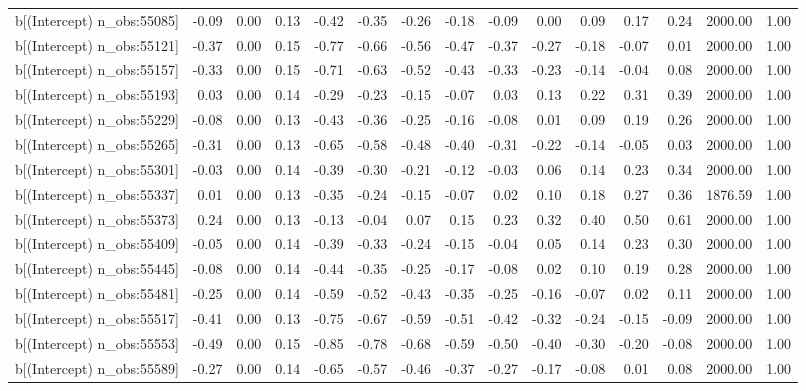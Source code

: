 \begin{table}[ht]
\begin{tabular}{rrrrrrrrrrrrrrr}
  b[(Intercept) n\_obs:55085] & -0.09 & 0.00 & 0.13 & -0.42 & -0.35 & -0.26 & -0.18 & -0.09 & 0.00 & 0.09 & 0.17 & 0.24 & 2000.00 & 1.00 \\ 
  b[(Intercept) n\_obs:55121] & -0.37 & 0.00 & 0.15 & -0.77 & -0.66 & -0.56 & -0.47 & -0.37 & -0.27 & -0.18 & -0.07 & 0.01 & 2000.00 & 1.00 \\ 
  b[(Intercept) n\_obs:55157] & -0.33 & 0.00 & 0.15 & -0.71 & -0.63 & -0.52 & -0.43 & -0.33 & -0.23 & -0.14 & -0.04 & 0.08 & 2000.00 & 1.00 \\ 
  b[(Intercept) n\_obs:55193] & 0.03 & 0.00 & 0.14 & -0.29 & -0.23 & -0.15 & -0.07 & 0.03 & 0.13 & 0.22 & 0.31 & 0.39 & 2000.00 & 1.00 \\ 
  b[(Intercept) n\_obs:55229] & -0.08 & 0.00 & 0.13 & -0.43 & -0.36 & -0.25 & -0.16 & -0.08 & 0.01 & 0.09 & 0.19 & 0.26 & 2000.00 & 1.00 \\ 
  b[(Intercept) n\_obs:55265] & -0.31 & 0.00 & 0.13 & -0.65 & -0.58 & -0.48 & -0.40 & -0.31 & -0.22 & -0.14 & -0.05 & 0.03 & 2000.00 & 1.00 \\ 
  b[(Intercept) n\_obs:55301] & -0.03 & 0.00 & 0.14 & -0.39 & -0.30 & -0.21 & -0.12 & -0.03 & 0.06 & 0.14 & 0.23 & 0.34 & 2000.00 & 1.00 \\ 
  b[(Intercept) n\_obs:55337] & 0.01 & 0.00 & 0.13 & -0.35 & -0.24 & -0.15 & -0.07 & 0.02 & 0.10 & 0.18 & 0.27 & 0.36 & 1876.59 & 1.00 \\ 
  b[(Intercept) n\_obs:55373] & 0.24 & 0.00 & 0.13 & -0.13 & -0.04 & 0.07 & 0.15 & 0.23 & 0.32 & 0.40 & 0.50 & 0.61 & 2000.00 & 1.00 \\ 
  b[(Intercept) n\_obs:55409] & -0.05 & 0.00 & 0.14 & -0.39 & -0.33 & -0.24 & -0.15 & -0.04 & 0.05 & 0.14 & 0.23 & 0.30 & 2000.00 & 1.00 \\ 
  b[(Intercept) n\_obs:55445] & -0.08 & 0.00 & 0.14 & -0.44 & -0.35 & -0.25 & -0.17 & -0.08 & 0.02 & 0.10 & 0.19 & 0.28 & 2000.00 & 1.00 \\ 
  b[(Intercept) n\_obs:55481] & -0.25 & 0.00 & 0.14 & -0.59 & -0.52 & -0.43 & -0.35 & -0.25 & -0.16 & -0.07 & 0.02 & 0.11 & 2000.00 & 1.00 \\ 
  b[(Intercept) n\_obs:55517] & -0.41 & 0.00 & 0.13 & -0.75 & -0.67 & -0.59 & -0.51 & -0.42 & -0.32 & -0.24 & -0.15 & -0.09 & 2000.00 & 1.00 \\ 
  b[(Intercept) n\_obs:55553] & -0.49 & 0.00 & 0.15 & -0.85 & -0.78 & -0.68 & -0.59 & -0.50 & -0.40 & -0.30 & -0.20 & -0.08 & 2000.00 & 1.00 \\ 
  b[(Intercept) n\_obs:55589] & -0.27 & 0.00 & 0.14 & -0.65 & -0.57 & -0.46 & -0.37 & -0.27 & -0.17 & -0.08 & 0.01 & 0.08 & 2000.00 & 1.00 \\ 

\end{tabular}
\end{table}

